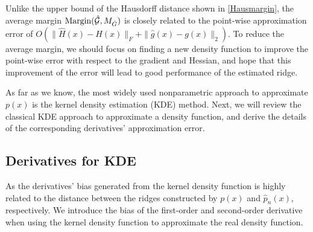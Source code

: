 \documentclass[aos,preprint]{imsart}
\theoremstyle{remark}
\begin{document}

Unlike the upper bound of the Hausdorff distance shown in \eqref{Hausmargin}, the average margin ${\rm Margin}(\hat {\mathcal G}, M_{\hat{G}})$ is closely related to the point-wise approximation error of $O (\|\hat{H}(x)-H(x)\|_F+\|\hat{g}(x)-g(x)\|_2)$. To reduce the average margin, we should focus on finding a new density function to improve the point-wise error with respect to the gradient and Hessian, and hope that this improvement of the error will lead to good performance of the estimated ridge.

As far as we know, the most widely used nonparametric approach to approximate $p(x)$ is the kernel density estimation (KDE) method. Next, we will review the classical KDE approach to approximate a density function, and derive the details of the corresponding derivatives' approximation error.
\subsection{Derivatives for KDE}
As the derivatives' bias generated from the kernel density function is highly related to the distance between the ridges constructed by $p(x)$ and $\hat{p}_n(x)$, respectively. We introduce the bias of the first-order and second-order derivative when using the kernel density function to approximate the real density function.
\end{document}

